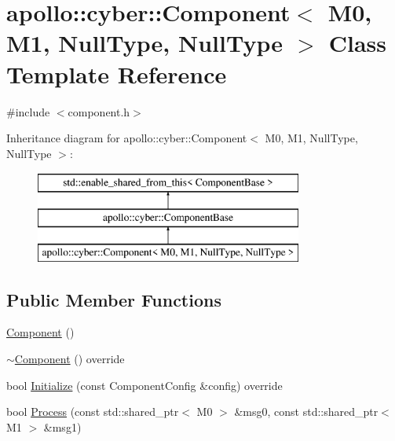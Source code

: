 \hypertarget{classapollo_1_1cyber_1_1Component_3_01M0_00_01M1_00_01NullType_00_01NullType_01_4}{\section{apollo\-:\-:cyber\-:\-:Component$<$ M0, M1, Null\-Type, Null\-Type $>$ Class Template Reference}
\label{classapollo_1_1cyber_1_1Component_3_01M0_00_01M1_00_01NullType_00_01NullType_01_4}
}


{\ttfamily \#include $<$component.\-h$>$}

Inheritance diagram for apollo\-:\-:cyber\-:\-:Component$<$ M0, M1, Null\-Type, Null\-Type $>$\-:\begin{figure}[H]
\begin{center}
\leavevmode
\includegraphics[height=3.000000cm]{classapollo_1_1cyber_1_1Component_3_01M0_00_01M1_00_01NullType_00_01NullType_01_4}
\end{center}
\end{figure}
\subsection*{Public Member Functions}
\begin{DoxyCompactItemize}
\item 
\hyperlink{classapollo_1_1cyber_1_1Component_3_01M0_00_01M1_00_01NullType_00_01NullType_01_4_ace00fd57f08d90d2bc8f985933134474}{Component} ()
\item 
\hyperlink{classapollo_1_1cyber_1_1Component_3_01M0_00_01M1_00_01NullType_00_01NullType_01_4_a8de0c0d0b19262388f1935e5c5e3f6f2}{$\sim$\-Component} () override
\item 
bool \hyperlink{classapollo_1_1cyber_1_1Component_3_01M0_00_01M1_00_01NullType_00_01NullType_01_4_ab3c98c371afed14286ed36f89eb84e7f}{Initialize} (const Component\-Config \&config) override
\item 
bool \hyperlink{classapollo_1_1cyber_1_1Component_3_01M0_00_01M1_00_01NullType_00_01NullType_01_4_abbdb287a3556d1eb229374bf3a5f0d35}{Process} (const std\-::shared\-\_\-ptr$<$ M0 $>$ \&msg0, const std\-::shared\-\_\-ptr$<$ M1 $>$ \&msg1)
\end{DoxyCompactItemize}
